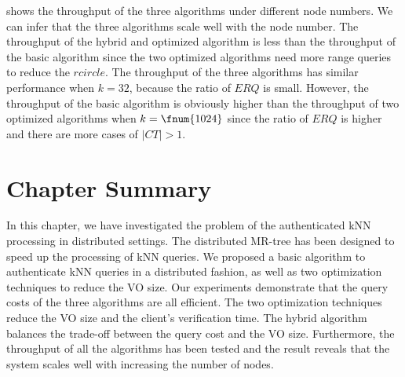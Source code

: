  shows the throughput of the three algorithms under different node numbers. We can infer that the three algorithms scale well with the node number. The throughput of the hybrid and optimized algorithm is less than the throughput of the basic algorithm since the two optimized algorithms need more range queries to reduce the $rcircle$. The throughput of the three algorithms has similar performance when $k=32$, because the ratio of $ERQ$ is small. However, the throughput of the basic algorithm is obviously higher than the throughput of two optimized algorithms when $k=\fnum{1024}$ since the ratio of $ERQ$ is higher and there are more cases of $|CT|>1$.

\section{Chapter Summary}\label{sec:knn:summary}
In this chapter, we have investigated the problem of the authenticated kNN processing in distributed settings. The distributed MR-tree has been designed to speed up the processing of kNN queries. We proposed a basic algorithm to authenticate kNN queries in a distributed fashion, as well as two optimization techniques to reduce the VO size. Our experiments demonstrate that the query costs of the three algorithms are all efficient. The two optimization techniques reduce the VO size and the client's verification time. The hybrid algorithm balances the trade-off between the query cost and the VO size. Furthermore, the throughput of all the algorithms has been tested and the result reveals that the system scales well with increasing the number of nodes.
